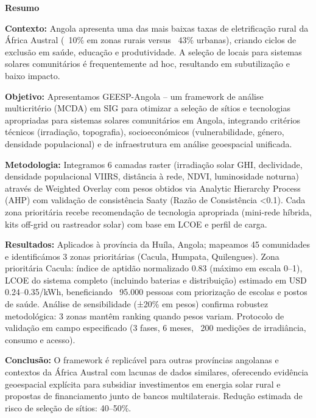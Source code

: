 \documentclass[12pt, a4paper]{article}
\begin{document}
\begin{abstractbox}
\begin{center}
  {\large\bfseries\color{PrimaryBlue} Resumo}
\end{center}
\smallskip
\textbf{Contexto:} Angola apresenta uma das mais baixas taxas de eletrificação rural da África Austral (~10\% em zonas rurais versus ~43\% urbanas), criando ciclos de exclusão em saúde, educação e produtividade. A seleção de locais para sistemas solares comunitários é frequentemente ad hoc, resultando em subutilização e baixo impacto.

\textbf{Objetivo:} Apresentamos GEESP-Angola – um framework de análise multicritério (MCDA) em SIG para otimizar a seleção de sítios e tecnologias apropriadas para sistemas solares comunitários em Angola, integrando critérios técnicos (irradiação, topografia), socioeconómicos (vulnerabilidade, género, densidade populacional) e de infraestrutura em análise geoespacial unificada.

\textbf{Metodologia:} Integramos 6 camadas raster (irradiação solar GHI, declividade, densidade populacional VIIRS, distância à rede, NDVI, luminosidade noturna) através de Weighted Overlay com pesos obtidos via Analytic Hierarchy Process (AHP) com validação de consistência Saaty (Razão de Consistência <0.1). Cada zona prioritária recebe recomendação de tecnologia apropriada (mini-rede híbrida, kits off-grid ou rastreador solar) com base em LCOE e perfil de carga.

\textbf{Resultados:} Aplicados à província da Huíla, Angola; mapeamos 45 comunidades e identificámos 3 zonas prioritárias (Cacula, Humpata, Quilengues). Zona prioritária Cacula: índice de aptidão normalizado 0.83 (máximo em escala 0–1), LCOE do sistema completo (incluindo baterias e distribuição) estimado em USD 0.24–0.35/kWh, beneficiando ~95.000 pessoas com priorização de escolas e postos de saúde. Análise de sensibilidade (±20\% em pesos) confirma robustez metodológica: 3 zonas mantêm ranking quando pesos variam. Protocolo de validação em campo especificado (3 fases, 6 meses, ~200 medições de irradiância, consumo e acesso).

\textbf{Conclusão:} O framework é replicável para outras províncias angolanas e contextos da África Austral com lacunas de dados similares, oferecendo evidência geoespacial explícita para subsidiar investimentos em energia solar rural e propostas de financiamento junto de bancos multilaterais. Redução estimada de risco de seleção de sítios: 40–50\%.
\end{abstractbox}
\vspace{1em}
\end{document}
